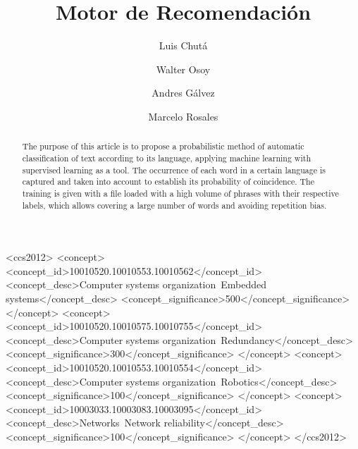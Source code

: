 \documentclass[sigconf]{acmart}
\begin{document}
\title{Motor de Recomendación}

\author{Luis Chutá}

\author{Walter Osoy}

\author{Andres Gálvez}

\author{Marcelo Rosales}

\renewcommand{\shortauthors}{Chutá, L., et al.}

\begin{abstract}
The purpose of this article is to propose a probabilistic method of automatic classification of text according to its language, applying machine learning with supervised learning as a tool. The occurrence of each word in a certain language is captured and taken into account to establish its probability of coincidence. The training is given with a file loaded with a high volume of phrases with their respective labels, which allows covering a large number of words and avoiding repetition bias.
\end{abstract}

\begin{CCSXML}
<ccs2012>
 <concept>
  <concept_id>10010520.10010553.10010562</concept_id>
  <concept_desc>Computer systems organization~Embedded systems</concept_desc>
  <concept_significance>500</concept_significance>
 </concept>
 <concept>
  <concept_id>10010520.10010575.10010755</concept_id>
  <concept_desc>Computer systems organization~Redundancy</concept_desc>
  <concept_significance>300</concept_significance>
 </concept>
 <concept>
  <concept_id>10010520.10010553.10010554</concept_id>
  <concept_desc>Computer systems organization~Robotics</concept_desc>
  <concept_significance>100</concept_significance>
 </concept>
 <concept>
  <concept_id>10003033.10003083.10003095</concept_id>
  <concept_desc>Networks~Network reliability</concept_desc>
  <concept_significance>100</concept_significance>
 </concept>
</ccs2012>
\end{CCSXML}

\end{document}
